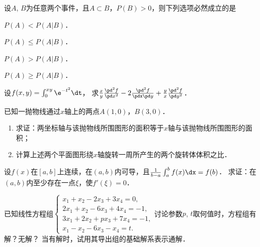 \documentclass[plain,noanswer,medmath]{../../template/jnuexam}
\begin{document}
\begin{problem}
设$A$, $B$为任意两个事件，且$A \subset B$，$P(B) > 0$，则下列选项必然成立的是
\begin{abcd}
\item $P(A) < P(A|B)$．
\item $P(A) \le P(A|B)$．
\item $P(A) > P(A|B)$．
\item $P(A) \ge P(A|B)$．
\end{abcd}
\end{problem}






\begin{problem}
设$f(x,y) = \int_0^{xy} \e^{- t^2} \dt$，
求$\frac{x}{y}\frac{\pd^2 f}{\pd x^2} - 2\frac{\pd^2 f}{\pdx\pd y}
+ \frac{y}{x}\frac{\pd^2 f}{\pd y^2}$．
\end{problem}









\begin{problem}
已知一抛物线通过$x$轴上的两点$A(1,0)$，$B(3,0)$．
\begin{enumerate}
\item 求证：两坐标轴与该抛物线所围图形的面积等于$x$轴与该抛物线所围图形的面积；
\item 计算上述两个平面图形绕$x$轴旋转一周所产生的两个旋转体体积之比．
\end{enumerate}
\end{problem}



\begin{problem}
设$f(x)$在$[a,b]$上连续，在$(a,b)$内可导，且$\frac{1}{b - a}\int_a^bf (x)\dx = f(b)$．
求证：在$(a,b)$内至少存在一点$\xi$，使$f'(\xi) = 0$．
\end{problem}



\begin{problem}
已知线性方程组$\begin{cases}
  x_1 + x_2 - 2x_3 + 3x_4 = 0, \\
  2x_1 + x_2 - 6x_3 + 4x_4 = - 1, \\
  3x_1 + 2x_2 + px_3 + 7x_4 = - 1, \\
  x_1 - x_2 - 6x_3 - x_4 = t.
\end{cases}$讨论参数$p$, $t$取何值时，方程组有解？无解？
当有解时，试用其导出组的基础解系表示通解．
\end{problem}
\end{document}
